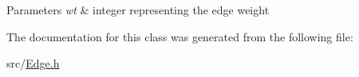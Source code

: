 \begin{DoxyParams}{Parameters}
{\em wt} & integer representing the edge weight \\
\hline
\end{DoxyParams}


The documentation for this class was generated from the following file\+:\begin{DoxyCompactItemize}
\item 
src/\hyperlink{_edge_8h}{Edge.\+h}\end{DoxyCompactItemize}
